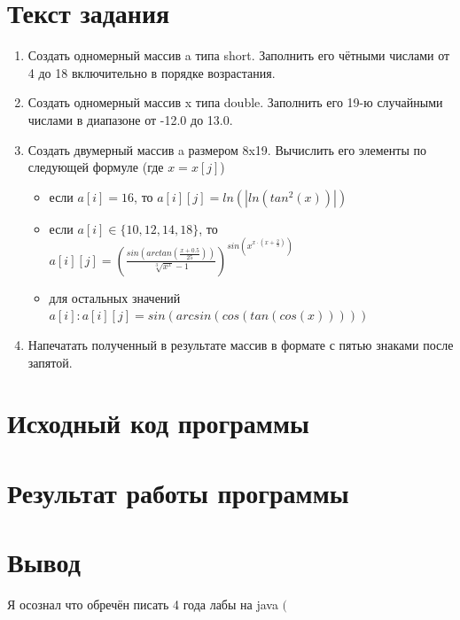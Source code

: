 \documentclass{article}
\begin{document}

\section*{Текст задания}

\begin{enumerate}
  \item Создать одномерный массив a типа short. Заполнить его чётными числами от 4 до 18 включительно в порядке возрастания.
  \item Создать одномерный массив x типа double. Заполнить его 19-ю случайными числами в диапазоне от -12.0 до 13.0.
  \item Создать двумерный массив a размером 8x19. Вычислить его элементы по следующей формуле (где $x = x[j]$) \begin{itemize}
          \item если $a[i] = 16$, то $a[i][j] = ln(|ln(tan^2(x))|)$
          \item если $a[i] \in \{10, 12, 14, 18\}$, то $
                  a[i][j] = \left(
                  \frac{
                    sin\left(arctan\left(\frac{x+0.5}{25}\right)\right)
                  }{
                    \sqrt[3]{x^x}-1
                  }
                  \right)^{
                    sin\left(x^{x\cdot\left(x+\frac{2}{3}\right)}\right)
                  }
                $
          \item для остальных значений $a[i]: a[i][j]=sin(arcsin(cos(tan(cos(x)))))$
        \end{itemize}
  \item Напечатать полученный в результате массив в формате с пятью знаками после запятой.
\end{enumerate}

\section*{Исходный код программы}


\section*{Результат работы программы}


\section*{Вывод}
Я осознал что обречён писать 4 года лабы на java $( $
\end{document}
